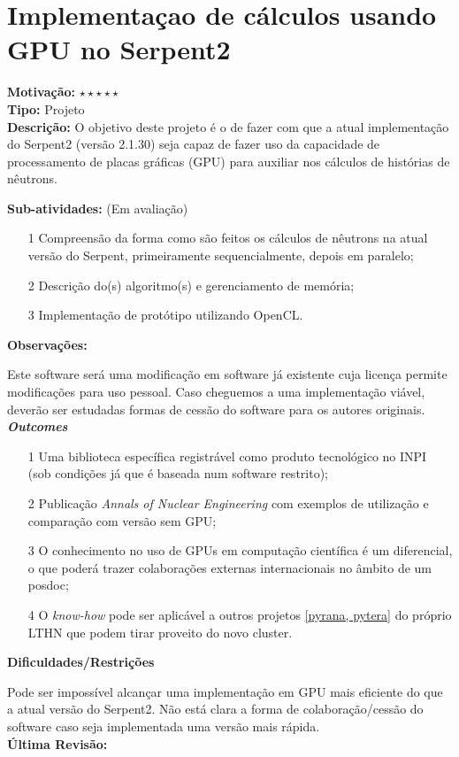 \chapter{Implementaçao de cálculos usando GPU no Serpent2}

\textbf{Motivação:} $\star\star\star\star\star$\\

\textbf{Tipo:} Projeto\\

\textbf{Descrição:} O objetivo deste projeto é o de fazer com que a atual 
implementação do Serpent2 (versão 2.1.30) seja capaz de fazer uso da capacidade de 
processamento de placas gráficas (GPU) para auxiliar nos cálculos de histórias de 
nêutrons.

\textbf{Sub-atividades:} (Em avaliação) \\

\begin{itemize}
	\item[1] Compreensão da forma como são feitos os cálculos de nêutrons na atual 
	versão do Serpent, primeiramente sequencialmente, depois em paralelo;
	\item[2] Descrição do(s) algoritmo(s) e gerenciamento de memória;
	\item[3] Implementação de protótipo utilizando OpenCL.
\end{itemize}

\textbf{Observações:}

Este software será uma modificação em software já existente cuja licença permite 
modificações para uso pessoal. Caso cheguemos a uma implementação viável, deverão 
ser estudadas formas de cessão do software para os autores originais.\\

\textbf{\textit{Outcomes}}

\begin{itemize}
	\item[1] Uma biblioteca específica registrável como produto tecnológico no 
INPI (sob condições já que é baseada num software restrito);
	\item[2] Publicação \textit{Annals of Nuclear Engineering} com exemplos de 
	utilização e comparação com versão sem GPU;
	\item[3] O conhecimento no uso de GPUs em computação científica é um diferencial, o que poderá trazer colaborações externas internacionais no âmbito de um posdoc;
	\item[4] O \textit{know-how} pode ser aplicável a outros projetos \ref{pyrana, pytera} do próprio LTHN que podem tirar proveito do novo cluster.
\end{itemize}

\textbf{Dificuldades/Restrições}

Pode ser impossível alcançar uma implementação em GPU mais eficiente do que 
a atual versão do Serpent2. Não está clara a forma de colaboração/cessão do software caso seja implementada uma versão mais rápida.\\

\textbf{Última Revisão:}
\date{\today}
